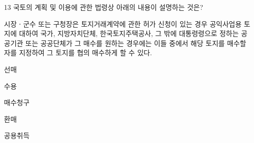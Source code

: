 \begin{question}{13}
국토의 계획 및 이용에 관한 법령상 아래의 내용이 설명하는 것은?
\begin{framedtext}
시장ㆍ군수 또는 구청장은 토지거래계약에 관한 허가 신청이 있는 경우 공익사업용 토지에 대하여 국가, 지방자치단체, 한국토지주택공사, 그 밖에 대통령령으로 정하는 공공기관 또는 공공단체가 그 매수를 원하는 경우에는 이들 중에서 해당 토지를 매수할 자를 지정하여 그 토지를 협의 매수하게 할 수 있다. \par
\end{framedtext}
\begin{choices}
  \item 선매
  \item 수용
  \item 매수청구
  \item 환매
  \item 공용취득
\end{choices}
\end{question}
